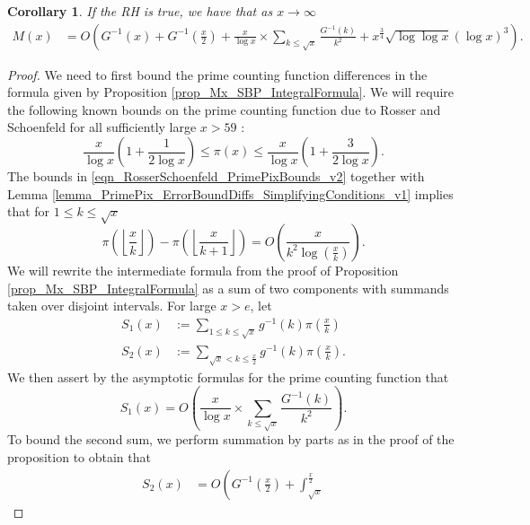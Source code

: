 \documentclass[11pt,reqno,a4letter]{article}
\numberwithin{figure}{section}
\numberwithin{table}{section}
\newcommand{\Floor}[2]{\ensuremath{\left\lfloor \frac{#1}{#2} \right\rfloor}}
\theoremstyle{plain}
\newtheorem{cor}[theorem]{Corollary}
\numberwithin{theorem}{section}
\theoremstyle{definition}
\begin{document}
\begin{cor} 
\label{cor_IntFormulaGInvx_for_Mx_v1} 
If the RH is true, we have that as $x \rightarrow \infty$ 
\begin{align*}
M(x) & = O\left(G^{-1}(x) + G^{-1}\left(\frac{x}{2}\right) + 
     \frac{x}{\log x} \times \sum_{k \leq \sqrt{x}} \frac{G^{-1}(k)}{k^2}
     + x^{\frac{3}{4}} \sqrt{\log\log x} (\log x)^{3}\right). 
\end{align*} 
\end{cor}
\begin{proof}
We need to first bound the prime counting function differences in the formula given by 
Proposition \ref{prop_Mx_SBP_IntegralFormula}. 
We will require the following known bounds on the prime counting 
function due to Rosser and Schoenfeld for all sufficiently large $x > 59$ 
\cite[Thm.\ 1]{ROSSER-SCHOENFELD-1962}: 
\begin{equation} 
\label{eqn_RosserSchoenfeld_PrimePixBounds_v2} 
\frac{x}{\log x}\left(1 + \frac{1}{2\log x}\right) \leq \pi(x) \leq 
     \frac{x}{\log x}\left(1 + \frac{3}{2 \log x}\right). 
\end{equation} 
The bounds in \eqref{eqn_RosserSchoenfeld_PrimePixBounds_v2} together with 
Lemma \ref{lemma_PrimePix_ErrorBoundDiffs_SimplifyingConditions_v1} implies that 
for $1 \leq k \leq \sqrt{x}$ 
\begin{equation}
\label{eqn_PrimePiDifferenceOfTermsBound_v1}
\pi\left(\Floor{x}{k}\right) - \pi\left(\Floor{x}{k+1}\right) = 
     O\left(\frac{x}{k^2 \log\left(\frac{x}{k}\right)}\right). 
\end{equation}
We will rewrite the intermediate formula from the proof of 
Proposition \ref{prop_Mx_SBP_IntegralFormula} 
as a sum of two components with summands taken over disjoint intervals. 
For large $x > e$, let 
\begin{align*}
S_1(x) & := \sum_{1 \leq k \leq \sqrt{x}} g^{-1}(k) \pi\left(\frac{x}{k}\right) \\ 
S_2(x) & := \sum_{\sqrt{x} < k \leq \frac{x}{2}} g^{-1}(k) \pi\left(\frac{x}{k}\right).
\end{align*}
We then assert by the asymptotic formulas for the 
prime counting function that 
\[
S_1(x) = O\left(\frac{x}{\log x} \times \sum_{k \leq \sqrt{x}} 
     \frac{G^{-1}(k)}{k^2}\right). 
\]
To bound the second sum, we perform summation by parts as in the proof of 
the proposition to obtain that 
\begin{align*} 
S_2(x) & = O\left(G^{-1}\left(\frac{x}{2}\right) + \int_{\sqrt{x}}^{\frac{x}{2}} 

\end{align*}
\end{proof}
\end{document}
